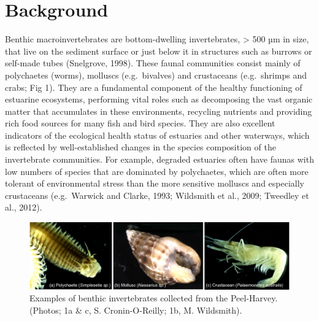 \documentclass[
]{book}
\begin{document}
\hypertarget{background}{%
\section{Background}\label{background}}

Benthic macroinvertebrates are bottom-dwelling invertebrates, \textgreater{} 500 µm in size, that live on the sediment surface or just below it in structures such as burrows or self-made tubes (Snelgrove, 1998). These faunal communities consist mainly of polychaetes (worms), molluscs (e.g.~bivalves) and crustaceans (e.g.~shrimps and crabs; Fig 1). They are a fundamental component of the healthy functioning of estuarine ecosystems, performing vital roles such as decomposing the vast organic matter that accumulates in these environments, recycling nutrients and providing rich food sources for many fish and bird species. They are also excellent indicators of the ecological health status of estuaries and other waterways, which is reflected by well-established changes in the species composition of the invertebrate communities. For example, degraded estuaries often have faunas with low numbers of species that are dominated by polychaetes, which are often more tolerant of environmental stress than the more sensitive molluscs and especially crustaceans (e.g.~Warwick and Clarke, 1993; Wildsmith et al., 2009; Tweedley et al., 2012).

\begin{figure}
\includegraphics[width=1\linewidth]{images/BMI/picture3} \caption{Examples of benthic invertebrates collected from the Peel-Harvey. (Photos; 1a & c, S. Cronin-O-Reilly; 1b, M. Wildsmith).}\label{fig:BMI-pic3}
\end{figure}
\end{document}
